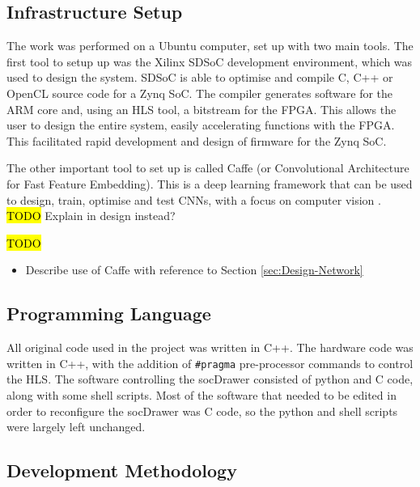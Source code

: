 \documentclass[12pt]{article}
\begin{document}
\subsection{Infrastructure Setup}
\label{sec:Imp-InfSetup}


The work was performed on a Ubuntu computer, set up with two main tools. The first tool to setup up was the Xilinx SDSoC development environment, which was used to design the system. SDSoC is able to optimise and compile C, C++ or OpenCL source code for a Zynq SoC. The compiler generates software for the ARM core and, using an HLS tool, a bitstream for the FPGA. This allows the user to design the entire system, easily accelerating functions with the FPGA. This facilitated rapid development and design of firmware for the Zynq SoC.

The other important tool to set up is called Caffe (or Convolutional Architecture for Fast Feature Embedding). This is a deep learning framework that can be used to design, train, optimise and test CNNs, with a focus on computer vision \cite{jia2014caffe}. \hl{TODO} Explain in design instead?



\hl{TODO}

\begin{itemize}
\item Describe use of Caffe with reference to Section \ref{sec:Design-Network}
\end{itemize}

\subsection{Programming Language}
\label{sec:Imp-Language}

All original code used in the project was written in C++. The hardware code was written in C++, with the addition of \lstinline|#pragma| pre-processor commands to control the HLS. The software controlling the socDrawer consisted of python and C code, along with some shell scripts. Most of the software that needed to be edited in order to reconfigure the socDrawer was C code, so the python and shell scripts were largely left unchanged.

\subsection{Development Methodology}
\label{sec:Imp-Devlopment}
\end{document}
